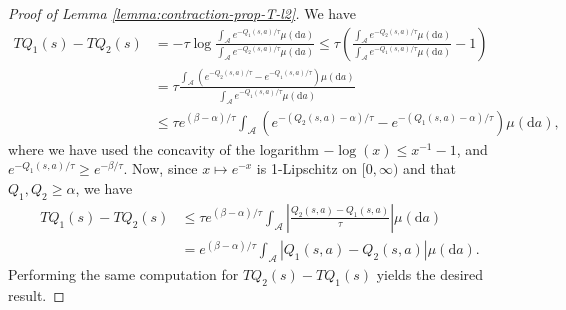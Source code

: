 \documentclass[11pt]{article}
\numberwithin{equation}{section}
\theoremstyle{definition}
\theoremstyle{remark}
\def\diff{{\mathrm{d}}}
\begin{document}
\begin{proof}[Proof of Lemma \ref{lemma:contraction-prop-T-l2}]
    We have
    \begin{equation*}
        \label{eq:contraction-prop-T-l2-long}
        \begin{aligned}
            TQ_1(s) - TQ_2(s) & = - \tau \log \frac{\int_{\mathcal A} e^{-Q_1(s,a) / \tau} \mu (\diff a)}{\int_{\mathcal A} e ^ {- Q_2(s,a) / \tau} \mu (\diff a)}                  \leq \tau \left( \frac{\int_{\mathcal A} e ^ {- Q_2(s,a) / \tau} \mu (\diff a)} {\int_{\mathcal A} e^{- Q_1(s,a) / \tau} \mu (\diff a)}- 1 \right)     \\
                          & =\tau \frac{\int_{\mathcal A} (e^{-Q_2(s,a)/ \tau} - e^{-Q_1(s,a) / \tau}) \mu (\diff a)}{\int_{\mathcal A} e^{- Q_1(s,a) / \tau} \mu (\diff a)}         \\
                          & \leq \tau e^{(\beta - \alpha) / \tau}\int_{\mathcal A} \left( e^{-(Q_2(s,a) - \alpha) / \tau} - e^{-(Q_1(s,a) - \alpha) / \tau} \right) \mu (\diff a),
        \end{aligned}
    \end{equation*}
    where we have used the concavity of the logarithm $- \log (x) \leq x^{-1} - 1$, and $e^{-Q_1(s,a) / \tau} \geq e^{-\beta / \tau}$. Now, since $x \mapsto e^{-x}$ is 1-Lipschitz on $[0,\infty)$ and that $Q_1,Q_2 \geq \alpha$, we have
    \begin{equation*}
        \begin{aligned}
            \label{eq:contraction-prop-T-l2-short}
            TQ_1(s) - TQ_2(s) & \leq \tau e^{(\beta - \alpha) / \tau} \int_{\mathcal A}\left| \frac{Q_2(s,a) - Q_1(s,a)}{\tau} \right| \mu (\diff a) \\
                          & = e^{(\beta - \alpha)/ \tau} \int_{\mathcal A} |Q_1(s,a) - Q_2(s,a)| \mu (\diff a).
        \end{aligned}
    \end{equation*}
Performing the same computation for  $TQ_2(s) - TQ_1(s)$  yields the desired result.
\end{proof}
\end{document}
